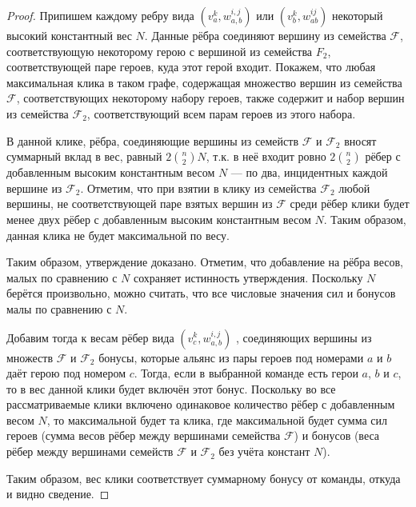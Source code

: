 \documentclass{article}
\begin{document}
\begin{proof}
    Припишем каждому ребру вида $(v_a^k, w_{a,b}^{i,j})$ или $(v_b^k, w_{ab}^{i j})$ некоторый высокий константный вес $N$. Данные рёбра соединяют вершину из семейства $\mathcal{F}$, соответствующую некоторому герою с вершиной из семейства $F_2$, соответствующей паре героев, куда этот герой входит. Покажем, что любая максимальная клика в таком графе, содержащая множество вершин из семейства $\mathcal{F}$, соответствующих некоторому набору героев, также содержит и набор вершин из семейства $\mathcal{F}_2$, соответствующий всем парам героев из этого набора.
    
    В данной клике, рёбра, соединяющие вершины из семейств $\mathcal{F}$ и $\mathcal{F}_2$ вносят суммарный вклад в вес, равный $2 \binom{n}{2} N$, т.к. в неё входит ровно $2 \binom{n}{2}$ рёбер с добавленным высоким константным весом $N$ --- по два, инцидентных каждой вершине из $\mathcal{F}_2$. Отметим, что при взятии в клику из семейства $\mathcal{F}_2$ любой вершины, не соответствующей паре взятых вершин из $\mathcal{F}$ среди рёбер клики будет менее двух рёбер с добавленным высоким константным весом $N$. Таким образом, данная клика не будет максимальной по весу.
    
Таким образом, утверждение доказано. Отметим, что добавление на рёбра весов, малых по сравнению с $N$ сохраняет истинность утверждения. Поскольку $N$ берётся произвольно, можно считать, что все числовые значения сил и бонусов малы по сравнению с $N$.

Добавим тогда к весам рёбер вида  $(v_c^{k}, w_{a,b}^{i,j} )$ , соединяющих вершины из множеств 
$\mathcal{F}$ и $\mathcal{F}_2$ бонусы, которые альянс из пары героев под номерами $a$ и $b$ даёт герою под номером $c$. Тогда, если в выбранной команде есть герои $a$, $b$ и $c$, то в вес данной клики будет включён этот бонус. Поскольку во все рассматриваемые клики включено одинаковое количество рёбер с добавленным весом $N$, то максимальной будет та клика, где максимальной будет сумма сил героев (сумма весов рёбер между вершинами семейства $\mathcal{F}$) и бонусов (веса рёбер между вершинами семейств $\mathcal{F}$ и $\mathcal{F}_2$ без учёта констант $N$).
    
Таким образом, вес клики соответствует суммарному бонусу от команды, откуда и видно сведение.
    
\end{proof}

\end{document}
